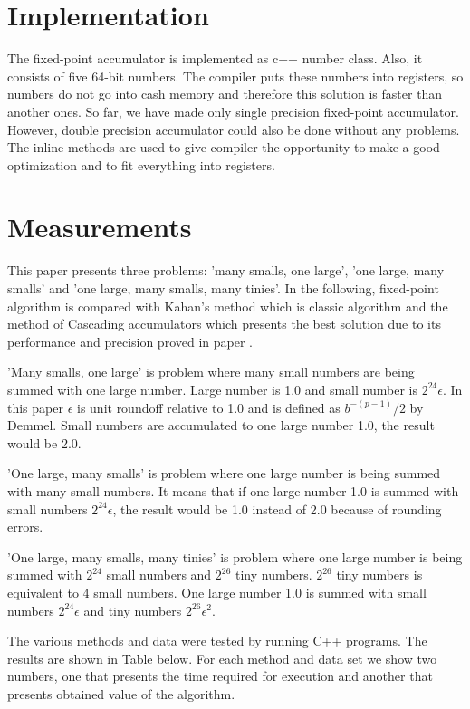 \documentclass[conference]{IEEEtran}
\begin{document}
\section{Implementation}
The fixed-point accumulator is implemented as c++ number class.
Also, it consists of five 64-bit numbers. The compiler puts these 
numbers into registers, so numbers do not go into cash
memory and therefore this solution is faster than another ones.
So far, we have made only single precision fixed-point 
accumulator. However, double precision accumulator could also 
be done without any problems. The inline methods are used to give compiler
the opportunity to make a good optimization and to fit
everything into registers.


\section{Measurements}
This paper presents three problems: 'many smalls, one large',
'one large, many smalls' and 'one large, many smalls, many tinies'.
In the following, fixed-point algorithm is compared with Kahan's method
which is classic algorithm and the method of Cascading accumulators 
which presents the best solution due to its performance and precision 
proved in paper \cite{CascadingAccumulators}.


\par
'Many smalls, one large' is problem where many small numbers 
are being summed with one large number. 
Large number is 1.0 and small number is $2^{24} \epsilon$.
In this paper $\epsilon$ is unit roundoff relative to 1.0 and is defined as $b^{-(p-1)}/2$ by Demmel.
Small numbers are accumulated to one large number 1.0, the result would be 2.0.
\par
'One large, many smalls' is problem where one large number 
is being summed with many small numbers. It means that
if one large number 1.0 is summed with small 
numbers $2^{24} \epsilon$, the result would be 1.0 instead 
of 2.0 because of rounding errors.
\par 
'One large, many smalls, many tinies' is problem where one 
large number is being summed with $2^{24}$ small numbers and $2^{26}$
tiny numbers. 
$2^{26}$ tiny numbers is equivalent to 4 small numbers.
One large number 1.0 is 
summed with small numbers $2^{24} \epsilon$ and tiny 
numbers $2^{26} \epsilon^2$.
\par
The various methods and data were tested by running C++ programs.
The results are shown in Table below. For each method and data 
set we show two numbers, one that presents the time required for 
execution and another that presents obtained value of the algorithm.
\end{document}
